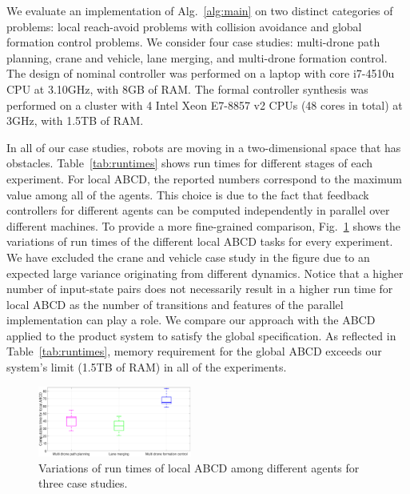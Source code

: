 We evaluate an implementation of Alg.~\ref{alg:main}
on two distinct categories of problems: 
local reach-avoid problems with collision avoidance and global formation control problems. 
We consider four case studies: multi-drone path planning, crane and vehicle, lane merging, and multi-drone formation control. 
The design of nominal controller was performed on a laptop with core i7-4510u CPU at 3.10GHz, with 8GB of RAM.
The formal controller synthesis was performed on a cluster with 4 Intel Xeon E7-8857 v2 CPUs (48 cores in total) at 3GHz, with 1.5TB of RAM. 

In all of our case studies, robots are moving in a two-dimensional space that has obstacles. 
Table~\ref{tab:runtimes} shows run times for different stages of each experiment. 
For local ABCD, the reported numbers correspond to the maximum value among all of the agents. 
This choice is due to the fact that feedback controllers for different agents can be computed independently 
in parallel over different machines. 
To provide a more fine-grained comparison,
Fig.~\ref{fig:box_plot} shows the variations of run times of the different local ABCD tasks for every experiment. 
We have excluded the crane and vehicle case study in the figure due to an expected large variance originating from different dynamics. 
Notice that a higher number of input-state pairs does not necessarily result in a higher run time for local ABCD as the 
number of transitions and features of the parallel implementation can play a role. 
%
We compare our approach with the ABCD applied to the product system to satisfy the global specification. 
As reflected in Table~\ref{tab:runtimes}, memory requirement for the global ABCD exceeds our system's limit (1.5TB of RAM) in all of the experiments.
%

\begin{figure}[t]
	\centering
	\includegraphics[width=0.45\textwidth]{figures/boxPlot2.eps}
	\caption{Variations of run times of local ABCD among different agents for three case studies. }
	\label{fig:box_plot}
\end{figure}

